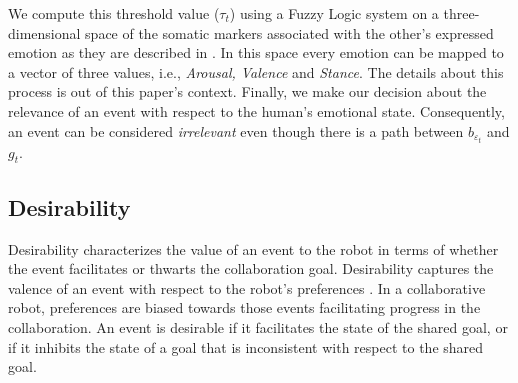 \documentclass{aamas2016}
\begin{document}
We compute this threshold value ($\tau_{t}$) using a Fuzzy Logic system on a
three-dimensional space of the somatic markers associated with the other's
expressed emotion as they are described in \cite{breazeal:sociable-robot}. In
this space every emotion can be mapped to a vector of three values, i.e.,
\textit{Arousal, Valence} and \textit{Stance}. The details about this process is
out of this paper's context. Finally, we make our decision about the relevance
of an event with respect to the human's emotional state. Consequently, an event
can be considered \textit{irrelevant} even though there is a path between
$\mathit{b}_{\varepsilon_t}$ and $g_{t}$.

\subsection{Desirability}

Desirability characterizes the value of an event to the robot in terms of
whether the event facilitates or thwarts the collaboration goal. Desirability
captures the valence of an event with respect to the robot's preferences
\cite{gratch:domain-independent}. In a collaborative robot, preferences are
biased towards those events facilitating progress in the collaboration. An event
is desirable if it facilitates the state of the shared goal, or if it inhibits
the state of a goal that is inconsistent with respect to the shared goal.
\end{document}
